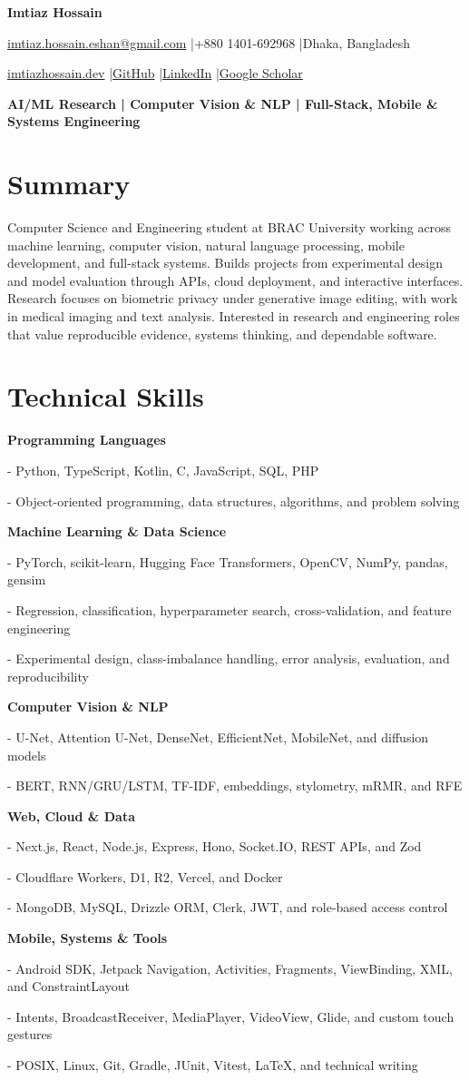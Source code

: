 \documentclass[10pt,a4paper]{article}
\newcommand{\skillgroup}[1]{\textbf{#1}\par}
\newcommand{\skillline}[1]{\hspace{0.6em}- #1\par}
\begin{document}
\fontsize{9.2}{10.5}\selectfont

{\LARGE\bfseries Imtiaz Hossain}\par
\href{mailto:imtiaz.hossain.eshan@gmail.com}{imtiaz.hossain.eshan@gmail.com}
\enspace|\enspace +880 1401-692968
\enspace|\enspace Dhaka, Bangladesh\par
\href{https://www.imtiazhossain.dev}{imtiazhossain.dev}
\enspace|\enspace \href{https://github.com/ImtiazHossain-Eshan}{GitHub}
\enspace|\enspace \href{https://www.linkedin.com/in/imtiazhossaineshan/}{LinkedIn}
\enspace|\enspace \href{https://scholar.google.com/citations?user=CIjeZSsAAAAJ}{Google Scholar}\par
\textbf{AI/ML Research | Computer Vision \& NLP | Full-Stack, Mobile \& Systems Engineering}

\section{Summary}
Computer Science and Engineering student at BRAC University working across machine learning, computer vision, natural language processing, mobile development, and full-stack systems. Builds projects from experimental design and model evaluation through APIs, cloud deployment, and interactive interfaces. Research focuses on biometric privacy under generative image editing, with work in medical imaging and text analysis. Interested in research and engineering roles that value reproducible evidence, systems thinking, and dependable software.

\section{Technical Skills}
\skillgroup{Programming Languages}
\skillline{Python, TypeScript, Kotlin, C, JavaScript, SQL, PHP}
\skillline{Object-oriented programming, data structures, algorithms, and problem solving}
\skillgroup{Machine Learning \& Data Science}
\skillline{PyTorch, scikit-learn, Hugging Face Transformers, OpenCV, NumPy, pandas, gensim}
\skillline{Regression, classification, hyperparameter search, cross-validation, and feature engineering}
\skillline{Experimental design, class-imbalance handling, error analysis, evaluation, and reproducibility}
\skillgroup{Computer Vision \& NLP}
\skillline{U-Net, Attention U-Net, DenseNet, EfficientNet, MobileNet, and diffusion models}
\skillline{BERT, RNN/GRU/LSTM, TF-IDF, embeddings, stylometry, mRMR, and RFE}
\skillgroup{Web, Cloud \& Data}
\skillline{Next.js, React, Node.js, Express, Hono, Socket.IO, REST APIs, and Zod}
\skillline{Cloudflare Workers, D1, R2, Vercel, and Docker}
\skillline{MongoDB, MySQL, Drizzle ORM, Clerk, JWT, and role-based access control}
\skillgroup{Mobile, Systems \& Tools}
\skillline{Android SDK, Jetpack Navigation, Activities, Fragments, ViewBinding, XML, and ConstraintLayout}
\skillline{Intents, BroadcastReceiver, MediaPlayer, VideoView, Glide, and custom touch gestures}
\skillline{POSIX, Linux, Git, Gradle, JUnit, Vitest, LaTeX, and technical writing}
\end{document}
